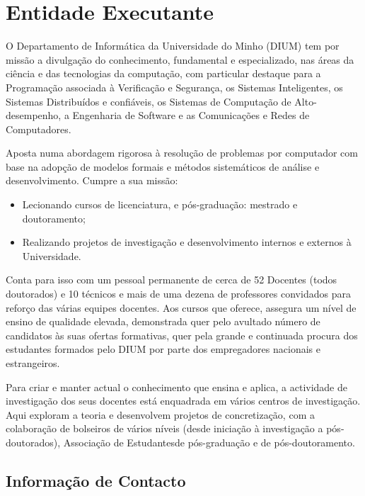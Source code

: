 \chapter{Entidade Executante}

O Departamento de Informática da Universidade do Minho (DIUM) tem por missão a divulgação do conhecimento, 
fundamental e especializado, nas áreas da ciência e das tecnologias da computação, com particular destaque para a 
Programação associada à Verificação e Segurança, os Sistemas Inteligentes, os Sistemas Distribuídos e confiáveis, 
os Sistemas de Computação de Alto-desempenho, a Engenharia de Software e as Comunicações e Redes de Computadores.

Aposta numa abordagem rigorosa à resolução de problemas por computador com base na adopção de modelos formais e 
métodos sistemáticos de análise e desenvolvimento. Cumpre a sua missão:

\begin{itemize}
    \item Lecionando cursos de licenciatura, e pós-graduação: mestrado e doutoramento;
    \item Realizando projetos de investigação e desenvolvimento internos e externos à Universidade.
\end{itemize}

Conta para isso com um pessoal permanente de cerca de 52 Docentes (todos doutorados) e 10 técnicos e mais de uma dezena 
de professores convidados para reforço das várias equipes docentes. Aos cursos que oferece, assegura um nível de ensino 
de qualidade elevada, demonstrada quer pelo avultado número de candidatos às suas ofertas formativas, quer pela grande e 
continuada procura dos estudantes formados pelo DIUM por parte dos empregadores nacionais e estrangeiros.

Para criar e manter actual o conhecimento que ensina e aplica, a actividade de investigação dos seus docentes está enquadrada 
em vários centros de investigação. Aqui exploram a teoria e desenvolvem projetos de concretização, com a colaboração de bolseiros 
de vários níveis (desde iniciação à investigação a pós-doutorados), Associação de Estudantesde pós-graduação e de pós-doutoramento.


\section{Informação de Contacto}

